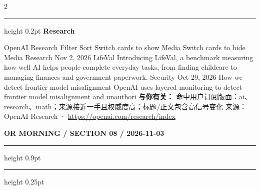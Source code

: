 \documentclass[10.5pt]{ctexart}
\begin{document}
\begin{multicols}{2}
\vspace{2mm}
\hrule height 0.2pt
\vspace{2mm}
{\large\bfseries Research}\par
OpenAI Research Filter Sort Switch cards to show Media Switch cards to hide Media Research Nov 2, 2026 LifeVal Introducing LifeVal, a benchmark measuring how well AI helps people complete everyday tasks, from finding childcare to managing finances and government paperwork. Security Oct 29, 2026 How we detect frontier model misalignment OpenAI uses layered monitoring to detect frontier model misalignment and unauthori
\textbf{与你有关：} 命中用户订阅版面：ai、research、math；来源接近一手且权威度高；标题/正文包含高信号变化
{\footnotesize\color{ormuted} 来源：OpenAI Research · \url{https://openai.com/research/index}}
\end{multicols}
\newpage
{\small\bfseries OR MORNING / SECTION 08 / 2026-11-03}
\vspace{2mm}
\hrule height 0.9pt
\vspace{1.5mm}
\hrule height 0.25pt
\vspace{4mm}
\end{document}

